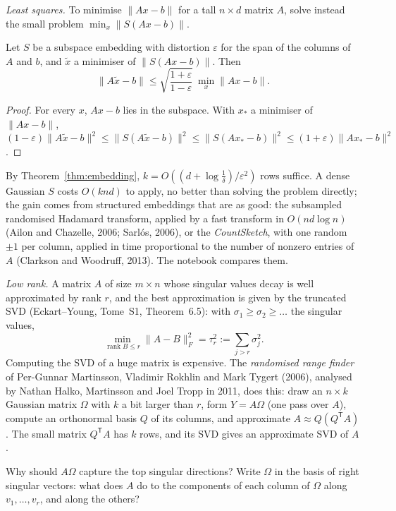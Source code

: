 \emph{Least squares.} To minimise $\|Ax-b\|$ for a tall $n\times d$ matrix $A$, solve instead the small problem $\min_x\|S(Ax-b)\|$.

\begin{theorem}\label{thm:sketchsolve}
Let $S$ be a subspace embedding with distortion $\varepsilon$ for the span of the columns of $A$ and $b$, and $\tilde x$ a minimiser of $\|S(Ax-b)\|$. Then
\[
\|A\tilde x-b\|\le\sqrt{\frac{1+\varepsilon}{1-\varepsilon}}\ \min_x\|Ax-b\|.
\]
\end{theorem}
\begin{proof}
For every $x$, $Ax-b$ lies in the subspace. With $x_*$ a minimiser of $\|Ax-b\|$,
$(1-\varepsilon)\|A\tilde x-b\|^2\le\|S(A\tilde x-b)\|^2\le\|S(Ax_*-b)\|^2\le(1+\varepsilon)\|Ax_*-b\|^2$.
\end{proof}

By Theorem~\ref{thm:embedding}, $k=O((d+\log\frac1\delta)/\varepsilon^2)$ rows suffice. A dense Gaussian $S$ costs $O(knd)$ to apply, no better than solving the problem directly;
the gain comes from structured embeddings that are as good: the subsampled randomised Hadamard transform, applied by a fast transform in $O(nd\log n)$ (Ailon and
Chazelle, 2006; Sarl\'os, 2006), or the \emph{CountSketch}, with one random $\pm1$ per column, applied in time proportional to the number of nonzero entries of $A$
(Clarkson and Woodruff, 2013). The notebook compares them.

\emph{Low rank.} A matrix $A$ of size $m\times n$ whose singular values decay is well approximated by rank $r$, and the best approximation is given by the truncated
SVD (Eckart--Young, Tome~S1, Theorem~6.5): with $\sigma_1\ge\sigma_2\ge\dots$ the singular values,
\[
\min_{\operatorname{rank}B\le r}\|A-B\|_F^2=\tau_r^2:=\sum_{j>r}\sigma_j^2.
\]
Computing the SVD of a huge matrix is expensive. The \emph{randomised range finder} of Per-Gunnar Martinsson, Vladimir Rokhlin and Mark Tygert (2006), analysed by Nathan
Halko, Martinsson and Joel Tropp in 2011, does this: draw an $n\times k$ Gaussian matrix $\Omega$ with $k$ a bit larger than $r$, form $Y=A\Omega$ (one pass over $A$), compute an
orthonormal basis $Q$ of its columns, and approximate $A\approx Q(Q^{\mathsf T}A)$. The small matrix $Q^{\mathsf T}A$ has $k$ rows, and its SVD gives an approximate SVD of $A$.

\begin{think}
Why should $A\Omega$ capture the top singular directions? Write $\Omega$ in the basis of right singular vectors: what does $A$ do to the components of each column of
$\Omega$ along $v_1,\dots,v_r$, and along the others?
\end{think}

